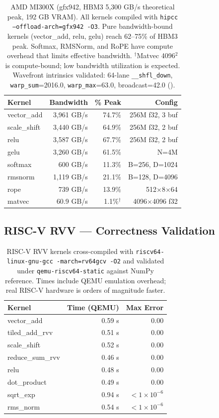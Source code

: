 \documentclass[10pt,twocolumn]{article}
\begin{document}
\begin{table}[H]
\centering
\footnotesize
\begin{tabular}{@{}lrrr@{}}
\toprule
\textbf{Kernel} & \textbf{Bandwidth} & \textbf{\% Peak} & \textbf{Config} \\
\midrule
vector\_add      & 3,961 GB/s & 74.7\% & 256M f32, 3 buf \\
scale\_shift     & 3,440 GB/s & 64.9\% & 256M f32, 2 buf \\
relu             & 3,587 GB/s & 67.7\% & 256M f32, 2 buf \\
gelu             & 3,260 GB/s & 61.5\% & N=4M \\
softmax          & 600 GB/s   & 11.3\% & B=256, D=1024 \\
rmsnorm          & 1,119 GB/s & 21.1\% & B=128, D=4096 \\
rope             & 739 GB/s   & 13.9\% & 512$\times$8$\times$64 \\
matvec           & 60.9 GB/s  & 1.1\%$^\dagger$ & 4096$\times$4096 f32 \\
\bottomrule
\end{tabular}
\caption{AMD MI300X (gfx942, HBM3 5,300 GB/s theoretical peak, 192 GB VRAM).
All kernels compiled with \texttt{hipcc --offload-arch=gfx942 -O3}.
Pure bandwidth-bound kernels (vector\_add, relu, gelu) reach 62--75\% of HBM3 peak.
Softmax, RMSNorm, and RoPE have compute overhead that limits effective bandwidth.
$^\dagger$Matvec 4096$^2$ is compute-bound; low bandwidth utilization is expected.
Wavefront intrinsics validated: 64-lane \texttt{\_\_shfl\_down},
\texttt{warp\_sum}=2016.0, \texttt{warp\_max}=63.0, broadcast=42.0 (\checkmark).}
\label{tab:mi100}
\end{table}

\subsection{RISC-V RVV --- Correctness Validation}

\begin{table}[H]
\centering
\footnotesize
\begin{tabular}{@{}lrr@{}}
\toprule
\textbf{Kernel} & \textbf{Time (QEMU)} & \textbf{Max Error} \\
\midrule
vector\_add & 0.59 s & 0.00 \\
tiled\_add\_rvv & 0.51 s & 0.00 \\
scale\_shift & 0.52 s & 0.00 \\
reduce\_sum\_rvv & 0.46 s & 0.00 \\
relu & 0.48 s & 0.00 \\
dot\_product & 0.49 s & 0.00 \\
sqrt\_exp & 0.94 s & $<1\times10^{-6}$ \\
rms\_norm & 0.54 s & $<1\times10^{-6}$ \\
\bottomrule
\end{tabular}
\caption{RISC-V RVV kernels cross-compiled with \texttt{riscv64-linux-gnu-gcc
-march=rv64gcv -O2} and validated under \texttt{qemu-riscv64-static} against
NumPy reference. Times include QEMU emulation overhead; real RISC-V hardware
is orders of magnitude faster.}
\label{tab:riscv}
\end{table}
\end{document}
